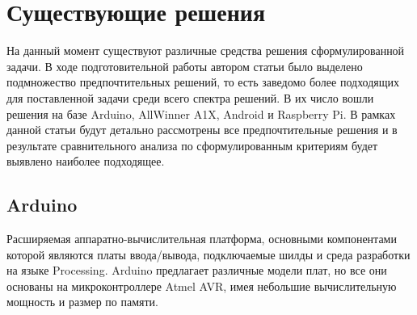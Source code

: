 \documentclass[twoside,a4paper]{msmb} %
\begin{document}
\section{Существующие решения}
На данный момент существуют различные средства решения сформулированной задачи. В ходе подготовительной работы автором статьи было выделено подмножество предпочтительных решений, то есть заведомо более подходящих для поставленной задачи среди всего спектра решений. В их число вошли решения на базе Arduino, AllWinner A1X, Android и Raspberry Pi. В рамках данной статьи будут детально рассмотрены все предпочтительные решения и в результате сравнительного анализа по сформулированным критериям будет выявлено наиболее подходящее.

\subsection{Arduino}
Расширяемая аппаратно-вычислительная платформа, основными компонентами которой являются платы ввода/вывода, подключаемые шилды и среда разработки на языке Processing. Arduino предлагает различные модели плат, но все они основаны на микроконтроллере Atmel AVR, имея небольшие вычислительную мощность и размер по памяти\cite{Arduino}.

\bgroup
\def\arraystretch{1.5}%
\end{document}
